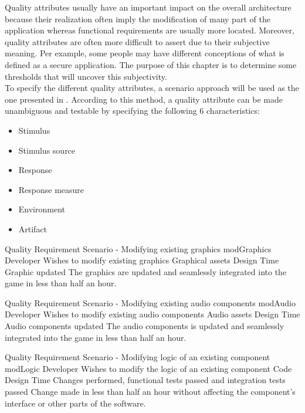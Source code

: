 

Quality attributes usually have an important impact on the overall architecture because their realization often imply the modification of many part of the application whereas functional requirements are usually more located. Moreover, quality attributes are often more difficult to assert due to their subjective meaning. Per example, some people may have different conceptions of what is defined as a secure application. The purpose of this chapter is to determine some thresholds that will uncover this subjectivity. \\

To specify the different quality attributes, a scenario approach will be used as the one presented in \cite[Chapter 4, p.68-69]{bass2013}. According to this method, a quality attribute can be made unambiguous and testable by specifying the following 6 characteristics:
\begin{itemize}
  \item Stimulus
  \item Stimulus source
  \item Response
  \item Response measure
  \item Environment
  \item Artifact
\end{itemize}


{Quality Requirement Scenario - Modifying existing graphics}
{modGraphics}
{Developer}
{Wishes to modify existing graphics}
{Graphical assets}
{Design Time}
{Graphic updated}
{The graphics are updated and seamlessly integrated into the game in less than half an hour.}

{Quality Requirement Scenario - Modifying existing audio components}
{modAudio}
{Developer}
{Wishes to modify existing audio components}
{Audio assets}
{Design Time}
{Audio components updated}
{The audio components is updated and seamlessly integrated into the game in less than half an hour.}

{Quality Requirement Scenario - Modifying logic of an existing component}
{modLogic}
{Developer}
{Wishes to modify the logic of an existing component}
{Code}
{Design Time}
{Changes performed, functional tests passed and integration tests passed}
{Change made in less than half an hour without affecting the component’s interface or other parts of the software.}


